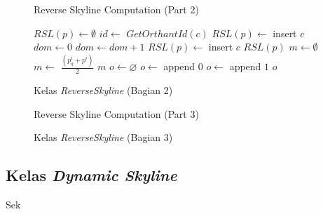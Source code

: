 \begin{figure}[H]
	\begin{algorithm}[H]
		\caption{Reverse Skyline Computation (Part 2)}
		\begin{algorithmic}[1]
				\State $RSL(p) \leftarrow \emptyset$
					\State $id \leftarrow$ $GetOrthantId(c)$
						\State $RSL(p) \leftarrow$ insert $c$
					\Else{}  
						\State $dom \leftarrow 0$
								\State $dom \leftarrow dom + 1$						
							\EndIf
						\EndFor
							\State $RSL(p) \leftarrow$ insert $c$
						\EndIf
					\EndIf
				\EndFor
				\State \Return $RSL(p)$
			\EndProcedure
				\State $m \leftarrow \emptyset$
				 $m \leftarrow$ $\frac{(p_q^i + p^i)}{2}$
				\EndFor
				\State \Return $m$
			\EndProcedure
				\State $o \leftarrow \varnothing$
					 $o \leftarrow$ append $0$
					\Else {} $o \leftarrow$ append $1$
					\EndIf
				\EndFor
				\State \Return $o$
			\EndProcedure
		\end{algorithmic}
	\end{algorithm}
	\caption{Kelas \textit{ReverseSkyline} (Bagian 2) \label{algo:rsl-class-2}}
\end{figure}
	
\begin{figure}[H]
	\begin{algorithm}[H]
		\caption{Reverse Skyline Computation (Part 3)}
		\begin{algorithmic}[1]
				
			\EndProcedure
		\end{algorithmic}
	\end{algorithm}
	\caption{Kelas \textit{ReverseSkyline} (Bagian 3) \label{algo:rsl-class-3}}
\end{figure}

\subsection{Kelas \textit{Dynamic Skyline}}
\tab Sek

